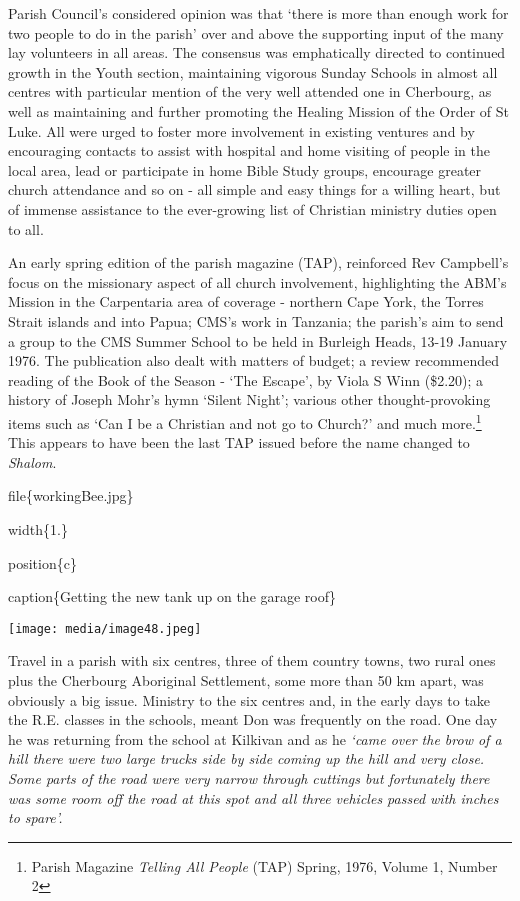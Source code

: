 Parish Council's considered opinion was that `there is more than enough work for two people to do in the parish' over and above the supporting input of the many lay volunteers in all areas. The consensus was emphatically directed to continued growth in the Youth section, maintaining vigorous Sunday Schools in almost all centres with particular mention of the very well attended one in Cherbourg, as well as maintaining and further promoting the Healing Mission of the Order of St Luke. All were urged to foster more involvement in existing ventures and by encouraging contacts to assist with hospital and home visiting of people in the local area, lead or participate in home Bible Study groups, encourage greater church attendance and so on - all simple and easy things for a willing heart, but of immense assistance to the ever-growing list of Christian ministry duties open to all.

An early spring edition of the parish magazine (TAP), reinforced Rev Campbell's focus on the missionary aspect of all church involvement, highlighting the ABM's Mission in the Carpentaria area of coverage - northern Cape York, the Torres Strait islands and into Papua; CMS's work in Tanzania; the parish's aim to send a group to the CMS Summer School to be held in Burleigh Heads, 13-19 January 1976. The publication also dealt with matters of budget; a review recommended reading of the Book of the Season - `The Escape', by Viola S Winn (\$2.20); a history of Joseph Mohr's hymn `Silent Night'; various other thought-provoking items such as `Can I be a Christian and not go to Church?' and much more.\footnote{Parish Magazine \emph{Telling All People} (TAP) Spring, 1976, Volume 1, Number 2} This appears to have been the last TAP issued before the name changed to \emph{Shalom}.

file\{workingBee.jpg\}

width\{1.\}

position\{c\}

caption\{Getting the new tank up on the garage roof\}

\texttt{[image: media/image48.jpeg]}

Travel in a parish with six centres, three of them country towns, two rural ones plus the Cherbourg Aboriginal Settlement, some more than 50 km apart, was obviously a big issue. Ministry to the six centres and, in the early days to take the R.E. classes in the schools, meant Don was frequently on the road. One day he was returning from the school at Kilkivan and as he \emph{`came over the brow of a hill there were two large trucks side by side coming up the hill and very close. Some parts of the road were very narrow through cuttings but fortunately there was some room off the road at this spot and all three vehicles passed with inches to spare'.}

